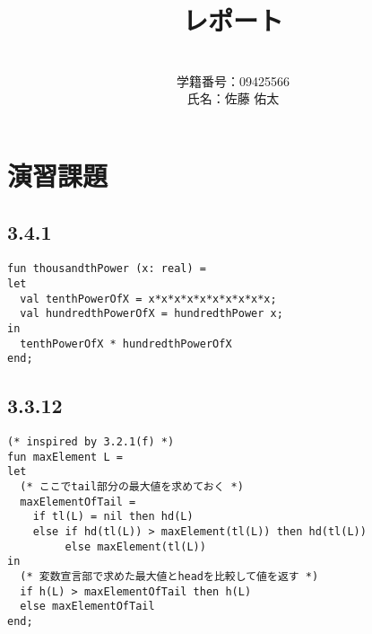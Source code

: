 \documentclass[a4j]{jarticle}
\title{レポート}
\author{\\学籍番号：09425566\\氏名：佐藤 佑太}
\begin{document}
\maketitle

\newpage


\section{演習課題}


\subsection{3.4.1}

\begin{verbatim}
fun thousandthPower (x: real) =
let
  val tenthPowerOfX = x*x*x*x*x*x*x*x*x*x;
  val hundredthPowerOfX = hundredthPower x;
in
  tenthPowerOfX * hundredthPowerOfX
end;
\end{verbatim}

\subsection{3.3.12}

\begin{verbatim}
(* inspired by 3.2.1(f) *)
fun maxElement L =
let
  (* ここでtail部分の最大値を求めておく *)
  maxElementOfTail = 
    if tl(L) = nil then hd(L)
    else if hd(tl(L)) > maxElement(tl(L)) then hd(tl(L))
         else maxElement(tl(L))
in
  (* 変数宣言部で求めた最大値とheadを比較して値を返す *)
  if h(L) > maxElementOfTail then h(L)
  else maxElementOfTail
end;
\end{verbatim}
\end{document}
